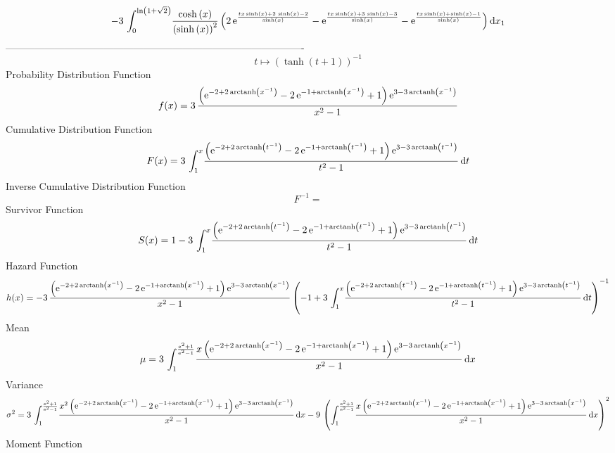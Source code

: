\documentclass[12pt]{article}
\begin{document}
 $$-3\,\int_{0}^{\ln  \left( 1+\sqrt {2} \right) }\!{\frac {\cosh \left( 
x \right) }{ \left( \sinh \left( x \right)  \right) ^{2}} \left( 2\,{
{\rm e}^{{\frac {tx\sinh \left( x \right) +2\,\sinh \left( x \right) -
2}{\sinh \left( x \right) }}}}-{{\rm e}^{{\frac {tx\sinh \left( x
 \right) +3\,\sinh \left( x \right) -3}{\sinh \left( x \right) }}}}-{
{\rm e}^{{\frac {tx\sinh \left( x \right) +\sinh \left( x \right) -1}{
\sinh \left( x \right) }}}} \right) }\,{\rm d}x_{{1}}
$$-------------------------------------------------------------------------------------------  \\$$t\mapsto  \left( \tanh \left( t+1 \right)  \right) ^{-1}
$$Probability Distribution Function 
$$  f(x)=3\,{\frac { \left( {{\rm e}^{-2+2\,{\rm arctanh} \left({x}^{-1}\right)
}}-2\,{{\rm e}^{-1+{\rm arctanh} \left({x}^{-1}\right)}}+1 \right) {
{\rm e}^{3-3\,{\rm arctanh} \left({x}^{-1}\right)}}}{{x}^{2}-1}}
$$Cumulative Distribution Function  
 $$F(x)=3\,\int_{1}^{x}\!{\frac { \left( {{\rm e}^{-2+2\,{\rm arctanh} \left({
t}^{-1}\right)}}-2\,{{\rm e}^{-1+{\rm arctanh} \left({t}^{-1}\right)}}
+1 \right) {{\rm e}^{3-3\,{\rm arctanh} \left({t}^{-1}\right)}}}{{t}^{
2}-1}}\,{\rm d}t
$$ Inverse Cumulative Distribution Function 
  $$F^{-1} = $$Survivor Function 
 $$ S(x)=1-3\,\int_{1}^{x}\!{\frac { \left( {{\rm e}^{-2+2\,{\rm arctanh} 
\left({t}^{-1}\right)}}-2\,{{\rm e}^{-1+{\rm arctanh} \left({t}^{-1}
\right)}}+1 \right) {{\rm e}^{3-3\,{\rm arctanh} \left({t}^{-1}\right)
}}}{{t}^{2}-1}}\,{\rm d}t
$$ Hazard Function 
 $$ h(x)=-3\,{\frac { \left( {{\rm e}^{-2+2\,{\rm arctanh} \left({x}^{-1}
\right)}}-2\,{{\rm e}^{-1+{\rm arctanh} \left({x}^{-1}\right)}}+1
 \right) {{\rm e}^{3-3\,{\rm arctanh} \left({x}^{-1}\right)}}}{{x}^{2}
-1} \left( -1+3\,\int_{1}^{x}\!{\frac { \left( {{\rm e}^{-2+2\,
{\rm arctanh} \left({t}^{-1}\right)}}-2\,{{\rm e}^{-1+{\rm arctanh} 
\left({t}^{-1}\right)}}+1 \right) {{\rm e}^{3-3\,{\rm arctanh} \left({
t}^{-1}\right)}}}{{t}^{2}-1}}\,{\rm d}t \right) ^{-1}}
$$Mean 
 $$ \mu=3\,\int_{1}^{{\frac {{{\rm e}^{2}}+1}{{{\rm e}^{2}}-1}}}\!{\frac {x
 \left( {{\rm e}^{-2+2\,{\rm arctanh} \left({x}^{-1}\right)}}-2\,{
{\rm e}^{-1+{\rm arctanh} \left({x}^{-1}\right)}}+1 \right) {{\rm e}^{
3-3\,{\rm arctanh} \left({x}^{-1}\right)}}}{{x}^{2}-1}}\,{\rm d}x
$$ Variance 
 $$ \sigma^2 = 3\,\int_{1}^{{\frac {{{\rm e}^{2}}+1}{{{\rm e}^{2}}-1}}}\!{\frac {{x}^
{2} \left( {{\rm e}^{-2+2\,{\rm arctanh} \left({x}^{-1}\right)}}-2\,{
{\rm e}^{-1+{\rm arctanh} \left({x}^{-1}\right)}}+1 \right) {{\rm e}^{
3-3\,{\rm arctanh} \left({x}^{-1}\right)}}}{{x}^{2}-1}}\,{\rm d}x-9\,
 \left( \int_{1}^{{\frac {{{\rm e}^{2}}+1}{{{\rm e}^{2}}-1}}}\!{\frac 
{x \left( {{\rm e}^{-2+2\,{\rm arctanh} \left({x}^{-1}\right)}}-2\,{
{\rm e}^{-1+{\rm arctanh} \left({x}^{-1}\right)}}+1 \right) {{\rm e}^{
3-3\,{\rm arctanh} \left({x}^{-1}\right)}}}{{x}^{2}-1}}\,{\rm d}x
 \right) ^{2}
$$Moment Function 
\end{document}
